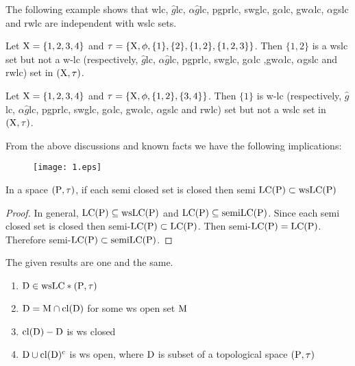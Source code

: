 \begin{rem}\label{rem6.2.20}
The following example shows that wlc, $\hat{g}$lc, $\alpha\hat{g}$lc, pgprlc, swglc, g$\alpha$lc, gw$\alpha$lc, $\alpha$gslc and rwlc are independent with wslc sets.
\end{rem}

\begin{exm}\label{exam6.2.21}
Let $\mathrm{X}= \{1, 2, 3, 4\}$ and $\tau=\{\mathrm{X}, \phi, \{1\}, \{2\}, \{1, 2\}, \{1, 2, 3\}\}$. Then $\{1, 2\}$ is a wslc set but not a w-lc (respectively, $\hat{g}$lc, $\alpha\hat{g}$lc, pgprlc, swglc, g$\alpha$lc ,gw$\alpha$lc, $\alpha$gslc and rwlc) set in $(\mathrm{X}, \tau)$.
\end{exm}

\begin{exm}\label{exam6.2.22}
Let $\mathrm{X}= \{1,2,3, 4\}$ and $\tau=\{\mathrm{X}, \phi, \{1, 2\}, \{3,4\}\}$. Then $\{1\}$ is w-lc (respectively, $\hat{g}$lc, $\alpha\hat{g}$lc, pgprlc, swglc, g$\alpha$lc, gw$\alpha$lc, $\alpha$gslc and rwlc) set but not a wslc set in $(\mathrm{X}, \tau)$.
\end{exm}

\begin{rem}\label{rem6.2.23}
From the above discussions and known facts we have the following implications:
\begin{figure}[H]
\centering
\texttt{[image: 1.eps]}
\end{figure}
\end{rem}

\begin{thm}\label{thm6.2.24}
In a space $(\mathrm{P}, \tau)$, if each semi closed set is closed then semi $\mathrm{LC}(\mathrm{P}) \subset \mathrm{ws}\mathrm{LC}(\mathrm{P})$
\end{thm}

\begin{proof}
In general, $\mathrm{LC}(\mathrm{P}) \subseteq \mathrm{ws}\mathrm{LC}(\mathrm{P})$ and $\mathrm{LC}(\mathrm{P}) \subseteq \mathrm{semi}\mathrm{LC}(\mathrm{P})$. Since each semi closed set is closed then semi-$\mathrm{LC}(\mathrm{P}) \subset \mathrm{LC}(\mathrm{P})$. Then semi-$\mathrm{LC}(\mathrm{P}) = \mathrm{LC}(\mathrm{P})$. Therefore semi-$\mathrm{LC}(\mathrm{P}) \subset \mathrm{semi}\mathrm{LC}(\mathrm{P})$.
\end{proof}

\begin{thm}\label{thm6.2.25}
The given results are one and the same.
\begin{enumerate}[(1)]
\item $\mathrm{D} \in\mathrm{ws}\mathrm{LC} * (\mathrm{P}, \tau)$
\item $\mathrm{D} = \mathrm{M} \cap \mathrm{cl}(\mathrm{D})$ for some ws open set $\mathrm{M}$
\item $\mathrm{cl}(\mathrm{D}) - \mathrm{D}$ is ws closed
\item $\mathrm{D} \cup \mathrm{cl}(\mathrm{D})^{\text{c}}$ is ws open, where $\mathrm{D}$ is subset of a topological space $(\mathrm{P}, \tau)$
\end{enumerate}
\end{thm}

